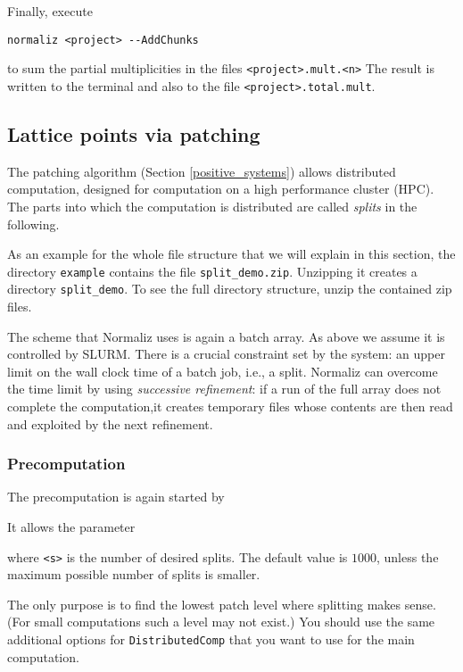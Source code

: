 Finally, execute 
\begin{Verbatim}
normaliz <project> --AddChunks
\end{Verbatim}
to sum the partial multiplicities in the files \verb|<project>.mult.<n>| The result is written to the terminal and also to the file \verb|<project>.total.mult|.

\subsection{Lattice points via patching}\label{DistPatch}

The patching algorithm (Section \ref{positive_systems}) allows distributed computation, designed for computation on a high performance cluster (HPC). The parts into which the computation is distributed are called \emph{splits} in the following.

As an example for the whole file structure that we will explain in this section, the directory \verb*|example| contains the file \verb*|split_demo.zip|. Unzipping it creates a directory \verb*|split_demo|. To see the full directory structure, unzip the contained zip files.

The scheme that Normaliz uses is again a batch array. As above we assume it is controlled by SLURM. There is a crucial  constraint set by the system: an upper limit on the wall clock time of a batch job, i.e., a split. Normaliz can overcome the time limit by using \emph{successive refinement}: if a run of the full array does not complete the computation,it creates temporary files whose contents are then read and exploited by the next refinement.

\subsubsection{Precomputation}

The precomputation is again started by
\begin{itemize}
\end{itemize}
It allows the parameter
\begin{itemize}
\end{itemize}
where \verb*|<s>| is the number of desired splits. The default value is $1000$, unless the maximum possible number of splits is smaller. 

 The only purpose is to find the lowest patch level where splitting makes sense. (For small computations such a level may not exist.) You should use the same additional options for \verb*|DistributedComp| that you want to use for the main computation.
 
